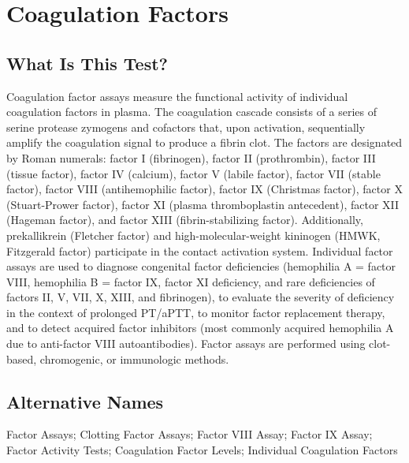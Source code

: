 \chapter{Coagulation Factors}

\section*{What Is This Test?}
Coagulation factor assays measure the functional activity of individual coagulation factors in plasma. The coagulation cascade consists of a series of serine protease zymogens and cofactors that, upon activation, sequentially amplify the coagulation signal to produce a fibrin clot. The factors are designated by Roman numerals: factor I (fibrinogen), factor II (prothrombin), factor III (tissue factor), factor IV (calcium), factor V (labile factor), factor VII (stable factor), factor VIII (antihemophilic factor), factor IX (Christmas factor), factor X (Stuart-Prower factor), factor XI (plasma thromboplastin antecedent), factor XII (Hageman factor), and factor XIII (fibrin-stabilizing factor). Additionally, prekallikrein (Fletcher factor) and high-molecular-weight kininogen (HMWK, Fitzgerald factor) participate in the contact activation system. Individual factor assays are used to diagnose congenital factor deficiencies (hemophilia A = factor VIII, hemophilia B = factor IX, factor XI deficiency, and rare deficiencies of factors II, V, VII, X, XIII, and fibrinogen), to evaluate the severity of deficiency in the context of prolonged PT/aPTT, to monitor factor replacement therapy, and to detect acquired factor inhibitors (most commonly acquired hemophilia A due to anti-factor VIII autoantibodies). Factor assays are performed using clot-based, chromogenic, or immunologic methods.

\section*{Alternative Names}
Factor Assays; Clotting Factor Assays; Factor VIII Assay; Factor IX Assay; Factor Activity Tests; Coagulation Factor Levels; Individual Coagulation Factors

